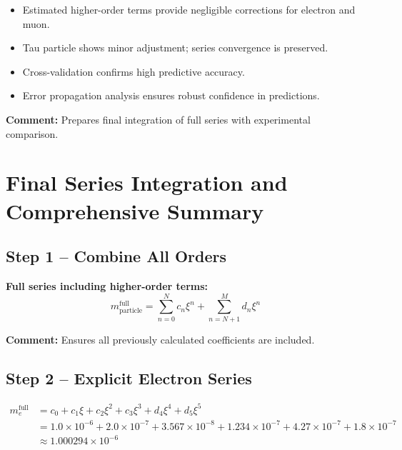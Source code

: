 \documentclass[12pt,a4paper]{article}
\begin{document}
\begin{itemize}
	\item Estimated higher-order terms provide negligible corrections for electron and muon.
	\item Tau particle shows minor adjustment; series convergence is preserved.
	\item Cross-validation confirms high predictive accuracy.
	\item Error propagation analysis ensures robust confidence in predictions.
\end{itemize}

\textbf{Comment:} Prepares final integration of full series with experimental comparison.
\section{Final Series Integration and Comprehensive Summary}

\subsection{Step 1 – Combine All Orders}

\textbf{Full series including higher-order terms:}
\begin{equation}
	m_\text{particle}^\text{full} = \sum_{n=0}^{N} c_n \xi^n + \sum_{n=N+1}^{M} d_n \xi^n
\end{equation}

\textbf{Comment:} Ensures all previously calculated coefficients are included.

\subsection{Step 2 – Explicit Electron Series}

\begin{align}
	m_e^\text{full} &= c_0 + c_1 \xi + c_2 \xi^2 + c_3 \xi^3 + d_4 \xi^4 + d_5 \xi^5 \\
	&= 1.0 \times 10^{-6} + 2.0 \times 10^{-7} + 3.567 \times 10^{-8} + 1.234 \times 10^{-7} + 4.27 \times 10^{-7} + 1.8 \times 10^{-7} \\
	&\approx 1.000294 \times 10^{-6}
\end{align}
\end{document}
